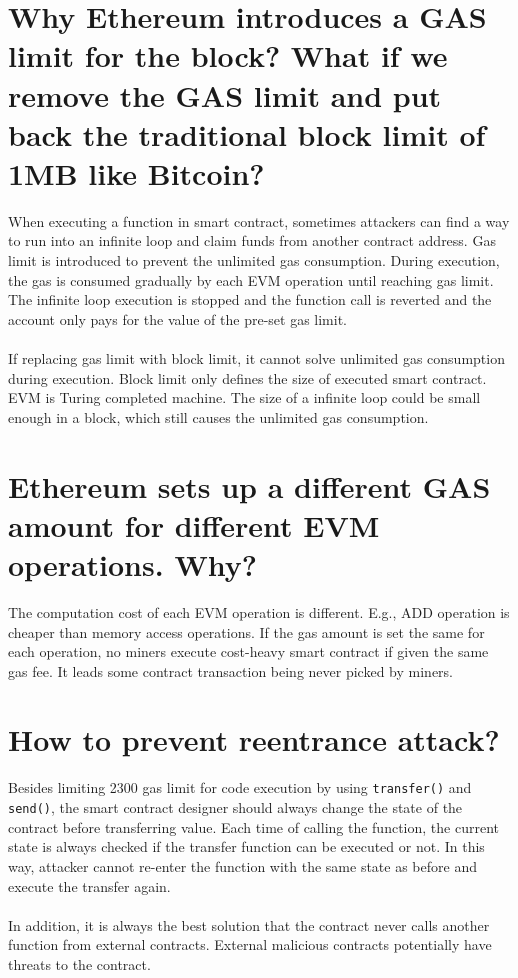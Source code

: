 \documentclass{article}
\begin{document}
\section{Why Ethereum introduces a GAS limit for the block? What if we remove the GAS
limit and put back the traditional block limit of 1MB like Bitcoin?}
When executing a function in smart contract, sometimes attackers can find a way to run into an infinite
loop and claim funds from another contract address. Gas limit is introduced to prevent the unlimited gas consumption.
During execution, the gas is consumed gradually by each EVM operation until reaching gas limit. 
The infinite loop execution is stopped and the function call is reverted and the account only pays for
the value of the pre-set gas limit.\\\\
If replacing gas limit with block limit, it cannot solve unlimited gas consumption during execution.
Block limit only defines the size of executed smart contract. EVM is Turing completed machine. The size of a infinite loop could be small enough in a block, which still causes the unlimited gas consumption.
\section{Ethereum sets up a different GAS amount for different EVM operations. Why?}
The computation cost of each EVM operation is different. E.g., ADD operation is cheaper than memory access operations. If the gas amount is set the same for each operation, no miners execute cost-heavy smart contract if given the same gas fee. It leads some contract transaction being never picked by miners.
\section{How to prevent reentrance attack?}
Besides limiting 2300 gas limit for code execution by using \verb|transfer()| and \verb|send()|, the smart contract designer should always change the state of the contract before transferring value. Each time of calling the function, the current state is always checked if the transfer function can be executed or not. In this way, attacker cannot re-enter the function with the same state as before and execute the transfer again.\\\\
In addition, it is always the best solution that the contract never calls another function from external contracts. External malicious contracts potentially have threats to the contract.
\end{document}
